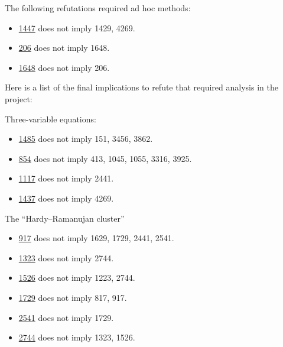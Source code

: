 The following refutations required ad hoc methods:
\begin{itemize}
\item \href{https://teorth.github.io/equational_theories/implications/?1447}{1447} does not imply 1429, 4269.
\item \href{https://teorth.github.io/equational_theories/implications/?206}{206} does not imply 1648.
\item \href{https://teorth.github.io/equational_theories/implications/?1648}{1648} does not imply 206.
\end{itemize}


Here is a list of the final implications to refute that required analysis in the project:

Three-variable equations:

\begin{itemize}
\item \href{https://teorth.github.io/equational_theories/implications/?1485}{1485} does not imply 151, 3456, 3862.
\item \href{https://teorth.github.io/equational_theories/implications/?854}{854} does not imply 413, 1045, 1055, 3316, 3925.
\item \href{https://teorth.github.io/equational_theories/implications/?1117}{1117} does not imply 2441.
\item \href{https://teorth.github.io/equational_theories/implications/?1437}{1437} does not imply 4269.
\end{itemize}

The ``Hardy--Ramanujan cluster''
\begin{itemize}
\item \href{https://teorth.github.io/equational_theories/implications/?917}{917} does not imply 1629, 1729, 2441, 2541.
\item \href{https://teorth.github.io/equational_theories/implications/?1323}{1323} does not imply 2744.
\item \href{https://teorth.github.io/equational_theories/implications/?1526}{1526} does not imply 1223, 2744.
\item \href{https://teorth.github.io/equational_theories/implications/?1729}{1729} does not imply 817, 917.
\item \href{https://teorth.github.io/equational_theories/implications/?2541}{2541} does not imply 1729.
\item \href{https://teorth.github.io/equational_theories/implications/?2744}{2744} does not imply 1323, 1526.
\end{itemize}

